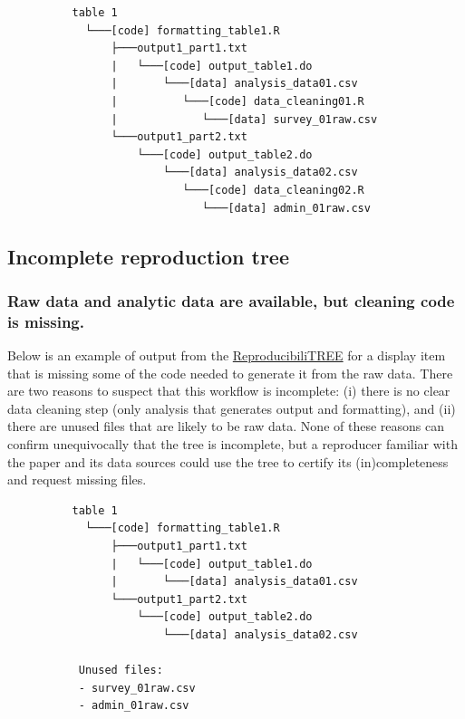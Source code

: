 \documentclass[
]{book}
\begin{document}
\begin{verbatim}
          table 1
            └───[code] formatting_table1.R
                ├───output1_part1.txt  
                |   └───[code] output_table1.do           
                |       └───[data] analysis_data01.csv
                |          └───[code] data_cleaning01.R
                |             └───[data] survey_01raw.csv
                └───output1_part2.txt  
                    └───[code] output_table2.do           
                        └───[data] analysis_data02.csv
                           └───[code] data_cleaning02.R
                              └───[data] admin_01raw.csv  
\end{verbatim}

\hypertarget{incomplete-reproduction-tree}{%
\subsection{Incomplete reproduction tree}\label{incomplete-reproduction-tree}}

\hypertarget{raw-data-and-analytic-data-are-available-but-cleaning-code-is-missing.}{%
\subsubsection{Raw data and analytic data are available, but cleaning code is missing.}\label{raw-data-and-analytic-data-are-available-but-cleaning-code-is-missing.}}

Below is an example of output from the \protect\hyperlink{diagram}{ReproducibiliTREE} for a display item that is missing some of the code needed to generate it from the raw data. There are two reasons to suspect that this workflow is incomplete: (i) there is no clear data cleaning step (only analysis that generates output and formatting), and (ii) there are unused files that are likely to be raw data. None of these reasons can confirm unequivocally that the tree is incomplete, but a reproducer familiar with the paper and its data sources could use the tree to certify its (in)completeness and request missing files.

\begin{verbatim}
          table 1
            └───[code] formatting_table1.R
                ├───output1_part1.txt  
                |   └───[code] output_table1.do           
                |       └───[data] analysis_data01.csv
                └───output1_part2.txt  
                    └───[code] output_table2.do           
                        └───[data] analysis_data02.csv

           Unused files: 
           - survey_01raw.csv
           - admin_01raw.csv  
\end{verbatim}
\end{document}
